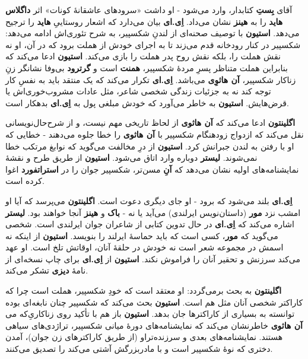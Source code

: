 \documentclass[12pt]{book}
\newcommand{\noun}[1]{{\textbf{#1}}}
\begin{document}
    آقای \noun{بِستِ} کتابدار، وارد می‌شود - او داشت «سرودهای عاشقانهٔ کونات» اثر \noun{داگلاس هاید} را به \noun{هینز}  نشان می‌داد. \noun{اِی.ای} بیان می‌دارد که اشعار روستاییِ \noun{هاید} را ترجیح می‌دهد. \noun{استیون} با توصیف صحنه‌ای از لندنِ شکسپیر، به شرح تئوری‌اش ادامه می‌دهد: شکسپیر در کنار رودخانه قدم می‌زند تا به اجرای خودش از هملت برود که در آن، او نه نقش هملت را، بلکه نقش روح پدر هملت را بازی می‌کند. \noun{استیون} ادعا می‌کند که بنابراین هملت متناظر پسرِ مردهٔ شکسپیر، \noun{همنت} است و \noun{گرترود} بی‌وفا نشانگر زنِ زناکار شکسپیر، \noun{آن هاثوِی} می‌باشد. \noun{اِی.ای} تکرار می‌کند که یک منتقد باید به نفسِ کار توجه کند نه به جزئیات زندگی شخصی شاعر، مثل عادات مشروب‌خوری‌اش یا قرض‌هایش. \noun{استیون} به خاطر می‌آورد که خودش مبلغی پول به \noun{اِی.ای} بدهکار است.

    \noun{اگلینتون} ادعا می‌کند که \noun{آن هاثوی} از لحاظ تاریخی مهم نیست، و از شرح‌حال‌نویسانی نقل می‌کند که ازدواج زودهنگام شکسپیر با \noun{آن هاثوی} را خطا جلوه می‌دهند - خطایی که او با رفتن به لندن جبرانش کرد. \noun{استیون} از درِ مخالفت می‌گوید که نوابغ مرتکب خطا نمی‌شوند. \noun{لیستر} دوباره وارد اتاق می‌شود. \noun{استیون} از طریق طرح و نقشهٔ نمایشنامه‌های اولیه نشان می‌دهد که \noun{آنِ} مسن‌تر، شکسپیر جوان را در \noun{استراتفورد} اغوا کرده است.

    \noun{اِی.ای} بلند می‌شود که برود - او جای دیگری دعوت است. \noun{اگلینتون} می‌پرسد که آیا او امشب نزد \noun{مور} (داستان‌نویس ایرلندی) می‌آید یا نه - \noun{باک}  و \noun{هینز}  آنجا خواهند بود. \noun{لیستر} اشاره می‌کند که \noun{اِی.ای} در حال تدوین کتابی از شاعران جوان ایرلندی است. شخصی می‌گوید که \noun{مور}، کسی است که باید حماسهٔ ایرلند را بنویسد. \noun{استیون} از اینکه نه اسمش در مجموعه شعر است نه خودش در حلقهٔ آنان، اوقاتش تلخ است. او عهد می‌کند سرزنش و تحقیر آنان را فراموش نکند. \noun{استیون} از \noun{اِی.ای} برای چاپ نسخه‌ای از نامهٔ \noun{دیزی} تشکر می‌کند.

    \noun{اگلینتون} به بحث برمی‌گردد: او معتقد است که خودِ شکسپیر، هملت است چرا که کاراکتر شخصی آنان مثل هم است. \noun{استیون} بحث می‌کند که شکسپیر چنان نابغه‌ای بوده که می‎‌توانسته به بسیاری از کاراکترها جان بدهد. \noun{استیون} باز هم با تأکید روی زناکاریِ \noun{آن هاثوی} خاطرنشان می‌کند که نمایشنامه‌های دورهٔ میانی شکسپیر، تراژدی‌های سیاهی هستند. نمایشنامه‌های بعدی و سرزنده‌تراو (از طریق کاراکترهای زن جوان)، آمدن دختری که نوهٔ شکسپیر است و با مادربزرگش آشتی می‌کند را تصدیق می‌کنند.
\end{document}
